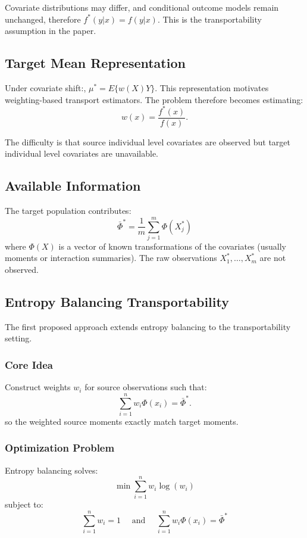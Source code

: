 \documentclass[11pt]{article}
\begin{document}
Covariate distributions may differ, and conditional outcome models remain unchanged, therefore $f^*(y|x)=f(y|x)$. This is the transportability assumption in the paper.

\subsection*{Target Mean Representation}

Under covariate shift:, $\mu^*=E\{w(X)Y\}$. This representation motivates weighting-based transport estimators. The problem therefore becomes estimating: \[w(x)=\frac{f^*(x)}{f(x)}.\]

The difficulty is that source individual level covariates are observed but target individual level covariates are unavailable.

\subsection*{Available Information}

The target population contributes:\[\bar{\Phi}^*=\frac{1}{m}\sum_{j=1}^{m}\Phi(X_j^*)\] where $\Phi(X)$ is a vector of known transformations of the covariates (usually moments or interaction summaries).
The raw observations $X_1^*,\ldots,X_m^*$ are not observed.

\subsection*{Entropy Balancing Transportability}

The first proposed approach extends entropy balancing to the transportability setting.

\subsubsection*{Core Idea}

Construct weights $w_i$ for source observations such that: \[\sum_{i=1}^{n}w_i \Phi(x_i)=\bar{\Phi}^*.\] so the weighted source moments exactly match target moments.

\subsubsection*{Optimization Problem}

Entropy balancing solves: \[\min\sum_{i=1}^{n}w_i \log(w_i)\] subject to: \[\sum_{i=1}^{n}w_i = 1 \quad \text{ and } \quad \sum_{i=1}^{n}w_i \Phi(x_i)=\bar{\Phi}^*\]
\end{document}
